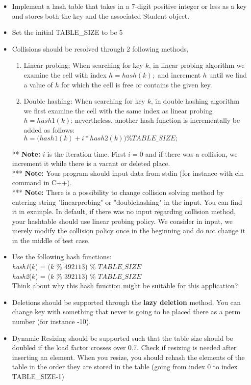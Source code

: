 \documentclass[times, 12pt]{article}
\begin{document}
\begin{itemize}
    \item Implement a hash table that takes in a 7-digit positive integer or less as a key and stores both the key and the associated Student object.
    
    \item Set the initial TABLE\_SIZE to be 5
    
    \item Collisions should be resolved through 2 following methods,
    \begin{enumerate}
        \item Linear probing: When searching for key $k$, in linear probing algorithm we examine the cell with index $h = hash(k);$ and increment $h$ until we find a value of $h$ for which the cell is free or contains the given key.
        \item Double hashing: When searching for key $k$, in double hashing algorithm we first examine the cell with the same index as linear probing $h = hash1(k)$; nevertheless, another hash function is incrementally be added as follows:\\
        $h = \Big(hash1(k) + i * hash2(k)\Big) \%TABLE\_SIZE;$
    \end{enumerate}
    ** \textbf{Note: }$i$ is the iteration time. First $i=0$ and if there was a collision, we increment it while there is a vacant or deleted place.\\
    *** \textbf{Note: }Your program should input data from stdin (for instance with cin command in C++).\\
    *** \textbf{Note: }There is a possibility to change collision solving method by entering string "linearprobing" or "doublehashing" in the input. You can find it in example. In default, if there was no input regarding collision method, your hashtable should use linear probing policy. We consider in input, we merely modify the collision policy once in the beginning and do not change it in the middle of test case.

    \item Use the following hash functions:\\ \textit{hash1}($k$) = ($k$ \% $492113$) \% $TABLE\_SIZE$\\ \textit{hash2}($k$) = ($k$ \% $392113$) \% $TABLE\_SIZE$\\
    Think about why this hash function might be suitable for this application?

    \item Deletions should be supported through the \textbf{lazy deletion} method. You can change key with something that never is going to be placed there as a perm number (for instance -10).
    
    \item Dynamic Resizing should be supported such that the table size should be doubled if the load factor crosses over 0.7. Check if resizing is needed after inserting an element. When you resize, you should rehash the elements of the table in the order they are stored in the table (going from index 0 to index TABLE\_SIZE-1)
\end{itemize}
\end{document}
